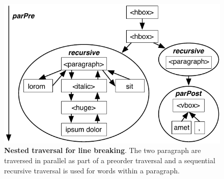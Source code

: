 \begin{figure}
\includegraphics[trim=0 0 0 0,clip,width=1.0\columnwidth]{chapter3/nested}
\caption{\textbf{Nested traversal for line breaking}. The two paragraph are traversed in parallel as part of a preorder traversal and a sequential recursive traversal is used for words within a paragraph.}
\label{fig:nested}
\end{figure}


